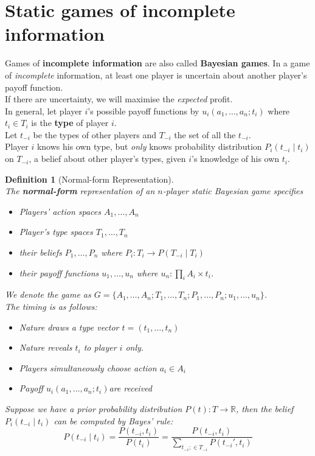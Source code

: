 \documentclass[12pt]{article}
\newtheorem{definition}{Definition}[section]
\theoremstyle{definition}
\begin{document}
\section{Static games of incomplete information}
Games of \textbf{incomplete information} are also called \textbf{Bayesian games}. In a game of \textit{incomplete} information, at least one player is uncertain about another player's payoff function.\\
If there are uncertainty, we will maximise the \textit{expected} profit.\\
In general, let player $i$'s possible payoff functions by $u_i(a_1,\ldots, a_n; t_i)$ where $t_i\in T_i$ is the \textbf{type} of player $i$.\\
Let $t_{-i}$ be the types of other players and $T_{-i}$ the set of all the $t_{-i}$.\\
Player $i$ knows his own type, but \textit{only} knows probability distribution $P_i(t_{-i}\mid t_i)$ on $T_{-i}$, a belief about other player's types, given $i$'s knowledge of his own $t_i$.
\begin{definition}[Normal-form Representation]
\hfill\\\normalfont The \textbf{normal-form} representation of an $n$-player static Bayesian game specifies
\begin{itemize}
  \item Players' action spaces $A_1,\ldots, A_n$
  \item Player's type spaces $T_1,\ldots, T_n$
  \item their beliefs $P_1,\ldots, P_n$ where $P_i: T_i\to P(T_{-i}\mid T_i)$
  \item their payoff functions $u_1,\ldots, u_n$ where $u_n:\prod_i A_i \times t_i$.
\end{itemize}
We denote the game as $G=\{A_1,\ldots, A_n; T_1,\ldots, T_n; P_1,\ldots, P_n; u_1,\ldots, u_n\}$.\\
The timing is as follows:
\begin{itemize}
  \item Nature draws a type vector $t=(t_1,\ldots, t_n)$
  \item Nature reveals $t_i$ to player $i$ only.
  \item Players simultaneously choose action $a_i\in A_i$
  \item Payoff $u_i(a_1,\ldots, a_n; t_i)$are received
\end{itemize}
Suppose we have a prior probability distribution $P(t): T \to \mathbb{R}$, then the belief $P_i(t_{-i}\mid t_i)$ can be computed by Bayes' rule:
\[
P(t_{-i}\mid t_i) =\frac{P(t_{-i}, t_i)}{P(t_i)}=\frac{P(t_{-i},t_i)}{\sum_{t_{-i};\in T_{-i}}P(t_{-i}', t_i)}
\]
\end{definition}
\end{document}
